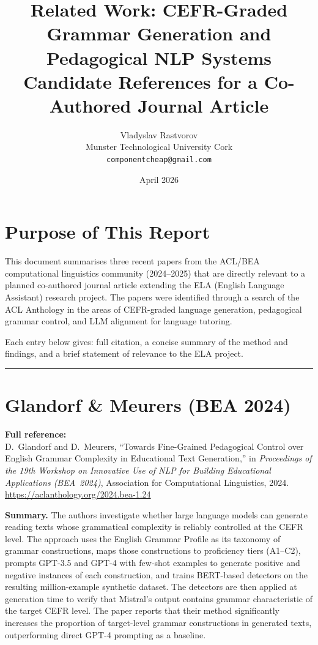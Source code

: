 \documentclass[12pt,a4paper]{article}
\title{\textbf{Related Work: CEFR-Graded Grammar Generation and\\Pedagogical NLP Systems}\\[0.5em]
\large Candidate References for a Co-Authored Journal Article}
\author{Vladyslav Rastvorov\\
Munster Technological University Cork\\
\texttt{componentcheap@gmail.com}}
\date{April 2026}
\begin{document}
\maketitle

\section*{Purpose of This Report}

This document summarises three recent papers from the ACL/BEA computational linguistics community (2024--2025) that are directly relevant to a planned co-authored journal article extending the ELA (English Language Assistant) research project. The papers were identified through a search of the ACL Anthology in the areas of CEFR-graded language generation, pedagogical grammar control, and LLM alignment for language tutoring.

Each entry below gives: full citation, a concise summary of the method and findings, and a brief statement of relevance to the ELA project.

\bigskip
\hrule
\bigskip

\section{Glandorf \& Meurers (BEA 2024)}

\textbf{Full reference:}\\
D.~Glandorf and D.~Meurers, ``Towards Fine-Grained Pedagogical Control over English Grammar Complexity in Educational Text Generation,'' in \textit{Proceedings of the 19th Workshop on Innovative Use of NLP for Building Educational Applications (BEA~2024)}, Association for Computational Linguistics, 2024.\\
\url{https://aclanthology.org/2024.bea-1.24}

\textbf{Summary.}
The authors investigate whether large language models can generate reading texts whose grammatical complexity is reliably controlled at the CEFR level. The approach uses the English Grammar Profile as its taxonomy of grammar constructions, maps those constructions to proficiency tiers (A1--C2), prompts GPT-3.5 and GPT-4 with few-shot examples to generate positive and negative instances of each construction, and trains BERT-based detectors on the resulting million-example synthetic dataset. The detectors are then applied at generation time to verify that Mistral's output contains grammar characteristic of the target CEFR level. The paper reports that their method significantly increases the proportion of target-level grammar constructions in generated texts, outperforming direct GPT-4 prompting as a baseline.
\end{document}

